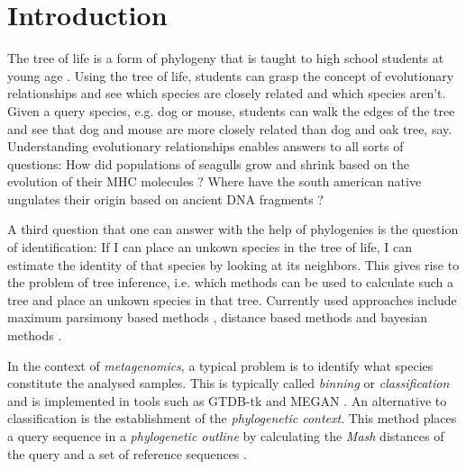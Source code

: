 
\chapter{Introduction}
  \label{sec:intro}

The tree of life is a form of phylogeny that is taught to high school students
at young age \cite{bildungsplanBiologie2015}. Using the tree of life, students
can grasp the concept of evolutionary relationships and see which species are
closely related and which species aren't. Given a query species, e.g. dog or
mouse, students can walk the edges of the tree and see that dog and mouse are
more closely related than dog and oak tree, say. Understanding evolutionary
relationships enables answers to all sorts of questions: How did populations of
seagulls grow and shrink based on the evolution of their MHC molecules
\cite{mancilla-moralesCharacterizationSelectionTransSpecies2022}? Where have the
south american native ungulates their origin based on ancient DNA fragments
\cite{welkerAncientProteinsResolve2015}?

A third question that one can answer with the help of phylogenies is the
question of identification: If I can place an unkown species in the tree of
life, I can estimate the identity of that species by looking at its neighbors.
This gives rise to the problem of tree inference, i.e. which methods can be used
to calculate such a tree and place an unkown species in that tree. Currently
used approaches include maximum parsimony based methods
\cite{sankoffMinimalMutationTrees1975}, distance based methods
\cite{saitouNeighborjoiningMethodNew1987} and bayesian methods
\cite{huelsenbeckMRBAYESBayesianInference2001}. 

In the context of \textit{metagenomics}, a typical problem is to identify what
species constitute the analysed samples. This is typically called
\textit{binning} or \textit{classification}
\cite{kuninBioinformaticianGuideMetagenomics2008} and is implemented in tools
such as GTDB-tk \cite{chaumeilGTDBTkToolkitClassify2020} and MEGAN
\cite{husonMEGANLRNewAlgorithms2018}. An alternative to classification is the
establishment of the \textit{phylogenetic context}. This method places a query
sequence in a \textit{phylogenetic outline} by calculating the \textit{Mash}
distances of
the query and a set of reference sequences
\cite{bagciMicrobialPhylogeneticContext2021}. 

